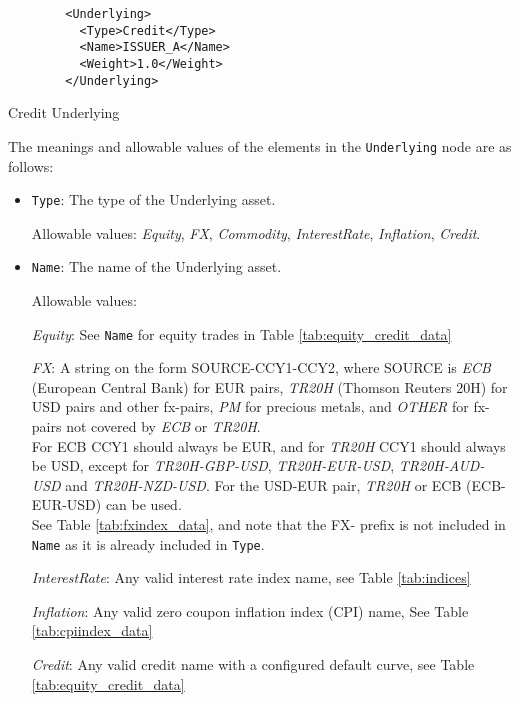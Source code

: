 \begin{listing}[H]
\begin{verbatim}
        <Underlying>
          <Type>Credit</Type>
          <Name>ISSUER_A</Name>
          <Weight>1.0</Weight>
        </Underlying>
\end{verbatim}
\caption{Credit Underlying}
\label{lst:crunderlying}
\end{listing}


The meanings and allowable values of the elements in the \lstinline!Underlying! node are as follows:

\begin{itemize}

\item \lstinline!Type!: The type of the Underlying asset.

  Allowable values:  \emph{Equity}, \emph{FX}, \emph{Commodity}, \emph{InterestRate}, \emph{Inflation}, \emph{Credit}.

\item \lstinline!Name!:
  The name of the Underlying asset. 
  
  Allowable values:  

  \emph{Equity}: See \lstinline!Name! for equity trades in Table \ref{tab:equity_credit_data}

  \emph{FX}: A string on the form SOURCE-CCY1-CCY2, where SOURCE is \emph{ECB} (European Central Bank) for EUR pairs, \emph{TR20H} (Thomson Reuters 20H) for USD pairs and other fx-pairs,  \emph{PM} for precious metals, and \emph{OTHER} for fx-pairs not covered by \emph{ECB} or \emph{TR20H}. \\ For ECB CCY1 should always be EUR, and for \emph{TR20H} CCY1 should always be USD, except for
  \emph{TR20H-GBP-USD}, \emph{TR20H-EUR-USD}, \emph{TR20H-AUD-USD} and \emph{TR20H-NZD-USD}. For the USD-EUR pair, \emph{TR20H} or ECB (ECB-EUR-USD) can be used. \\ See Table
  \ref{tab:fxindex_data}, and note that the FX- prefix is not included in \lstinline!Name! as it is already included in \lstinline!Type!.

 \emph{InterestRate}: Any valid interest rate index name, see Table \ref{tab:indices}

 \emph{Inflation}: Any valid zero coupon inflation index (CPI) name, See Table \ref{tab:cpiindex_data}

 \emph{Credit}: Any valid credit name with a configured default curve, see Table \ref{tab:equity_credit_data}


\end{itemize}
